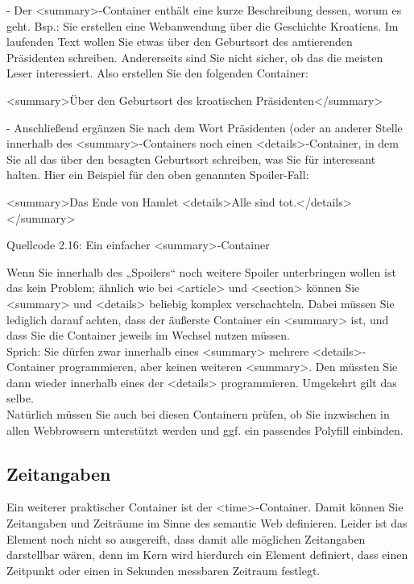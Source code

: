 -	Der <summary>-Container enthält eine kurze Beschreibung dessen, worum es geht. 
Bsp.: Sie erstellen eine Webanwendung über die Geschichte Kroatiens. Im laufenden Text wollen Sie etwas über den Geburtsort des amtierenden Präsidenten schreiben. Andererseits sind Sie nicht sicher, ob das die meisten Leser interessiert. Also erstellen Sie den folgenden Container:

<summary>Über den Geburtsort des kroatischen Präsidenten</summary>

-	Anschließend ergänzen Sie nach dem Wort Präsidenten (oder an anderer Stelle innerhalb des <summary>-Containers noch einen <details>-Container, in dem Sie all das über den besagten Geburtsort schreiben, was Sie für interessant halten.
Hier ein Beispiel für den oben genannten Spoiler-Fall:

<summary>Das Ende von Hamlet
<details>Alle sind tot.</details>
</summary>

Quellcode 2.16: Ein einfacher <summary>-Container

Wenn Sie innerhalb des „Spoilers“ noch weitere Spoiler unterbringen wollen ist das kein Problem; ähnlich wie bei <article> und <section> können Sie <summary> und <details> beliebig komplex verschachteln. Dabei müssen Sie lediglich darauf achten, dass der äußerste Container ein <summary> ist, und dass Sie die Container jeweils im Wechsel nutzen müssen.\\

Sprich: Sie dürfen zwar innerhalb eines <summary> mehrere <details>-Container programmieren, aber keinen weiteren <summary>. Den müssten Sie dann wieder innerhalb eines der <details> programmieren. Umgekehrt gilt das selbe.\\

Natürlich müssen Sie auch bei diesen Containern prüfen, ob Sie inzwischen in allen Webbrowsern unterstützt werden und ggf. ein passendes Polyfill einbinden.

\subsection{Zeitangaben}

Ein weiterer praktischer Container ist der <time>-Container. Damit können Sie Zeitangaben und Zeiträume im Sinne des semantic Web definieren. Leider ist das Element noch nicht so ausgereift, dass damit alle möglichen Zeitangaben darstellbar wären, denn im Kern wird hierdurch ein Element definiert, dass einen Zeitpunkt oder einen in Sekunden messbaren Zeitraum festlegt.\\

